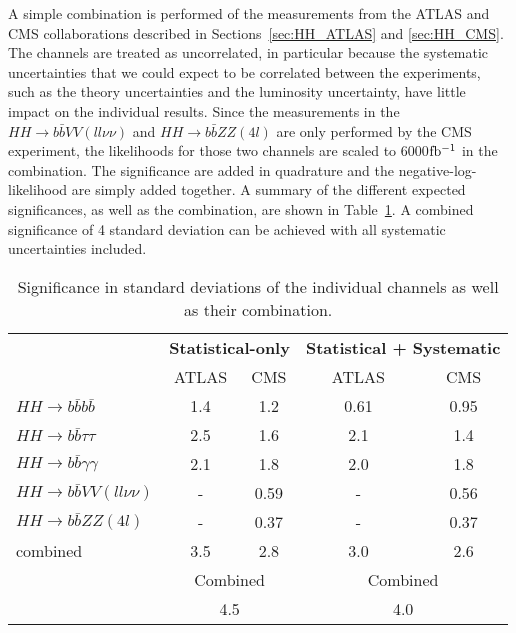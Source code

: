 A simple combination is performed of the measurements from the ATLAS and CMS collaborations described in Sections~\ref{sec:HH_ATLAS} and \ref{sec:HH_CMS}.
The channels are treated as uncorrelated, in particular because the systematic uncertainties that we could expect to be correlated between the experiments, such as the theory uncertainties and the luminosity uncertainty, have little impact on the individual results. Since the measurements in the $HH \rightarrow b\bar{b}VV(ll\nu\nu)$ and $HH \rightarrow b\bar{b}ZZ(4l)$ are only performed by the CMS experiment, the likelihoods for those two channels are scaled to 6000$\mbox{fb$^{-1}$}$ in the combination.
The significance are added in quadrature and the negative-log-likelihood are simply added together. A summary of the different expected significances, as well as the combination, are shown in Table~\ref{tab:comb_significance}. A combined significance of 4 standard deviation can be achieved with all systematic uncertainties included.

\begin{table}[htb!]
\begin{center}
\begin{tabular}{lcccc} \toprule
 & \multicolumn{2}{c}{\textbf{Statistical-only}} & \multicolumn{2}{c}{\textbf{Statistical + Systematic}}\\
 & ATLAS & CMS & ATLAS & CMS \\
\hline
$HH \rightarrow b\bar{b}b\bar{b}$ & 1.4 & 1.2 & 0.61 & 0.95 \\
$HH \rightarrow b\bar{b}\tau\tau$ & 2.5 & 1.6 & 2.1 & 1.4 \\
$HH \rightarrow b\bar{b}\gamma\gamma$ & 2.1 & 1.8 & 2.0 & 1.8 \\
$HH \rightarrow b\bar{b}VV(ll\nu\nu)$ & - & 0.59 & - & 0.56 \\
$HH \rightarrow b\bar{b}ZZ(4l)$ & - & 0.37 & - & 0.37 \\
combined &  3.5 & 2.8 & 3.0 & 2.6 \\
\hline
 &  \multicolumn{2}{c}{Combined} & \multicolumn{2}{c}{Combined}\\
 &  \multicolumn{2}{c}{4.5} & \multicolumn{2}{c}{4.0}\\
\bottomrule
\end{tabular}
\end{center}
\caption{Significance in standard deviations of the individual channels as well as their combination.}
\label{tab:comb_significance}
\end{table}

